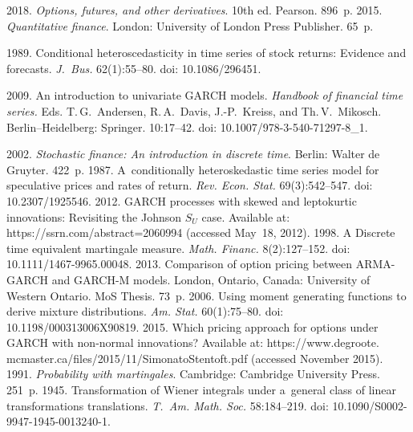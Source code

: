   \begin{multicols}{2}

\renewcommand{\bibname}{\protect\rmfamily References}

{\small\frenchspacing
 {%
 \begin{thebibliography}{99}
 2018. \textit{Options, futures, and other derivatives}. 10th ed. 
Pearson. 896~p.
 2015. 
\textit{Quantitative finance}. London: University of London 
Press Publisher. 65~p.

 1989. Conditional heteroscedasticity in time series of stock 
returns: Evidence and forecasts. \textit{J.~Bus.} 62(1):55--80. doi: 
10.1086/296451.

 2009. An introduction to univariate GARCH models. 
\textit{Handbook of financial time series.} Eds. T.\,G.~Andersen, R.\,A.~Davis,  
J.-P.~Kreiss, and Th.\,V.~Mikosch. Berlin--Heidelberg: Springer. 10:17--42. doi:  
10.1007/978-3-540-71297-8\_1.

 2002. \textit{Stochastic finance: An introduction 
in discrete time}. Berlin: Walter de Gruyter. 422~p.
 1987. A~conditionally heteroskedastic time series model for 
speculative prices and rates of return. \textit{Rev. Econ. Stat.} 
69(3):542--547. doi: 10.2307/1925546.
 2012. GARCH processes with skewed and leptokurtic 
innovations: Revisiting the Johnson $S_U$ case. Available at: {\sf 
https://ssrn.com/abstract=2060994} (accessed May~18, 2012).
 1998. A Discrete time equivalent martingale 
measure. \textit{Math. Financ.} 8(2):127--152. doi: 10.1111/1467-9965.00048.
 2013. Comparison of option pricing between ARMA-GARCH and 
GARCH-M models. 
 London, Ontario, Canada: University of Western Ontario.  MoS Thesis. 73~p.
 2006. Using moment generating functions to 
derive mixture distributions. \textit{Am. Stat.} 60(1):75--80. doi: 
10.1198/000313006X90819.
 2015. Which pricing approach for options 
under GARCH with non-normal innovations? Available at: {\sf 
https://www.degroote. mcmaster.ca/files/2015/11/SimonatoStentoft.pdf} (accessed 
November 2015).
 1991. \textit{Probability with martingales}. Cambridge: 
Cambridge University Press. 251~p.
 1945. Transformation of Wiener 
integrals under a~general class of linear transformations translations. 
\textit{T.~Am. Math. Soc.} 58:184--219. doi: 10.1090/S0002-9947-1945-0013240-1.


\end{thebibliography}}}
\end{multicols}

